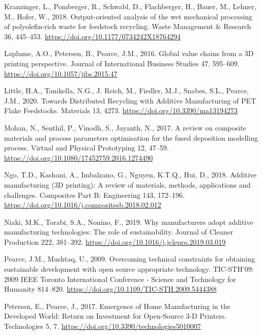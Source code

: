 \documentclass[
  11pt,
]{article}
\newlength{\cslhangindent}
\newlength{\cslentryspacingunit} %
\newenvironment{CSLReferences}[2] %
 {%
  \setlength{\parindent}{0pt}
  \ifodd #1
  \let\oldpar\par
  \def\par{\hangindent=\cslhangindent\oldpar}
  \fi
  \setlength{\parskip}{#2\cslentryspacingunit}
 }%
 {}
\begin{document}
\begin{CSLReferences}{1}{0}
\leavevmode{}%
Kranzinger, L., Pomberger, R., Schwabl, D., Flachberger, H., Bauer, M.,
Lehner, M., Hofer, W., 2018. Output-oriented analysis of the wet
mechanical processing of polyolefin-rich waste for feedstock recycling.
Waste Management \& Research 36, 445--453.
\url{https://doi.org/10.1177/0734242X18764294}

\leavevmode{}%
Laplume, A.O., Petersen, B., Pearce, J.M., 2016. Global value chains
from a {3D} printing perspective. Journal of International Business
Studies 47, 595--609. \url{https://doi.org/10.1057/jibs.2015.47}

\leavevmode{}%
Little, H.A., Tanikella, N.G., J. Reich, M., Fiedler, M.J., Snabes,
S.L., Pearce, J.M., 2020. Towards {Distributed Recycling} with {Additive
Manufacturing} of {PET Flake Feedstocks}. Materials 13, 4273.
\url{https://doi.org/10.3390/ma13194273}

\leavevmode{}%
Mohan, N., Senthil, P., Vinodh, S., Jayanth, N., 2017. A review on
composite materials and process parameters optimisation for the fused
deposition modelling process. Virtual and Physical Prototyping 12,
47--59. \url{https://doi.org/10.1080/17452759.2016.1274490}

\leavevmode{}%
Ngo, T.D., Kashani, A., Imbalzano, G., Nguyen, K.T.Q., Hui, D., 2018.
Additive manufacturing ({3D} printing): {A} review of materials,
methods, applications and challenges. Composites Part B: Engineering
143, 172--196. \url{https://doi.org/10.1016/j.compositesb.2018.02.012}

\leavevmode{}%
Niaki, M.K., Torabi, S.A., Nonino, F., 2019. Why manufacturers adopt
additive manufacturing technologies: {The} role of sustainability.
Journal of Cleaner Production 222, 381--392.
\url{https://doi.org/10.1016/j.jclepro.2019.03.019}

\leavevmode{}%
Pearce, J.M., Mushtaq, U., 2009. Overcoming technical constraints for
obtaining sustainable development with open source appropriate
technology. TIC-STH'09: 2009 IEEE Toronto International Conference -
Science and Technology for Humanity 814--820.
\url{https://doi.org/10.1109/TIC-STH.2009.5444388}

\leavevmode{}%
Petersen, E., Pearce, J., 2017. Emergence of {Home Manufacturing} in the
{Developed World}: {Return} on {Investment} for {Open-Source} 3-{D
Printers}. Technologies 5, 7.
\url{https://doi.org/10.3390/technologies5010007}


\end{CSLReferences}
\end{document}
